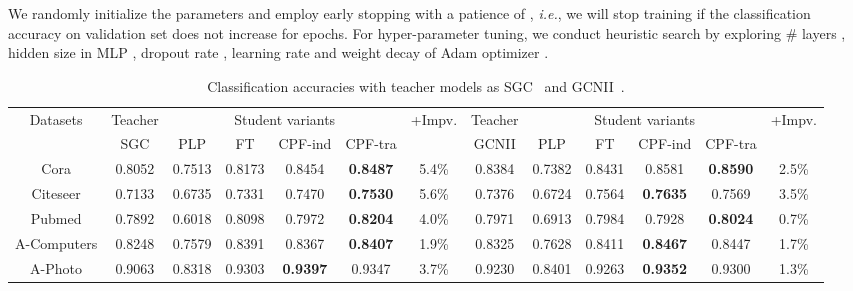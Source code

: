 \documentclass[sigconf]{acmart}
\begin{document}
We randomly initialize the parameters and employ early stopping with a patience of , \textit{i.e.}, we will stop training if the classification accuracy on validation set does not increase for  epochs. For hyper-parameter tuning, we conduct heuristic search by exploring \# layers , hidden size in MLP , dropout rate , learning rate and weight decay of Adam optimizer . 

\begin{table*}[ht]
\centering
\caption{Classification accuracies with teacher models as SGC~\cite{wu2019simplifying} and GCNII~\cite{chen2020simple}. }
\label{tab:acc3}
\begin{tabular}{|c|c|c|c|c|c|c||c|c|c|c|c|c|}
\hline
\multirow{2}{*}{Datasets} & Teacher & \multicolumn{4}{c|}{Student variants}               & \multirow{2}{*}{+Impv.} & Teacher & \multicolumn{4}{c|}{Student variants}               & \multirow{2}{*}{+Impv.} \\ \cline{2-6} \cline{8-12}
                          & SGC     & PLP    & FT     & CPF-ind         & CPF-tra         &                         & GCNII   & PLP    & FT     & CPF-ind         & CPF-tra         &                         \\ \hline
Cora                      & 0.8052  & 0.7513 & 0.8173 & 0.8454          & \textbf{0.8487} & 5.4\%                   & 0.8384  & 0.7382 & 0.8431 & 0.8581          & \textbf{0.8590} & 2.5\%                   \\ \hline
Citeseer                  & 0.7133  & 0.6735 & 0.7331 & 0.7470          & \textbf{0.7530} & 5.6\%                   & 0.7376  & 0.6724 & 0.7564 & \textbf{0.7635} & 0.7569          & 3.5\%                   \\ \hline
Pubmed                    & 0.7892  & 0.6018 & 0.8098 & 0.7972          & \textbf{0.8204} & 4.0\%                   & 0.7971  & 0.6913 & 0.7984 & 0.7928          & \textbf{0.8024} & 0.7\%                   \\ \hline
A-Computers               & 0.8248  & 0.7579 & 0.8391 & 0.8367          & \textbf{0.8407} & 1.9\%                   & 0.8325  & 0.7628 & 0.8411 & \textbf{0.8467} & 0.8447          & 1.7\%                   \\ \hline
A-Photo                   & 0.9063  & 0.8318 & 0.9303 & \textbf{0.9397} & 0.9347          & 3.7\%                   & 0.9230  & 0.8401 & 0.9263 & \textbf{0.9352} & 0.9300          & 1.3\%                   \\ \hline
\end{tabular}
\end{table*}
\end{document}
